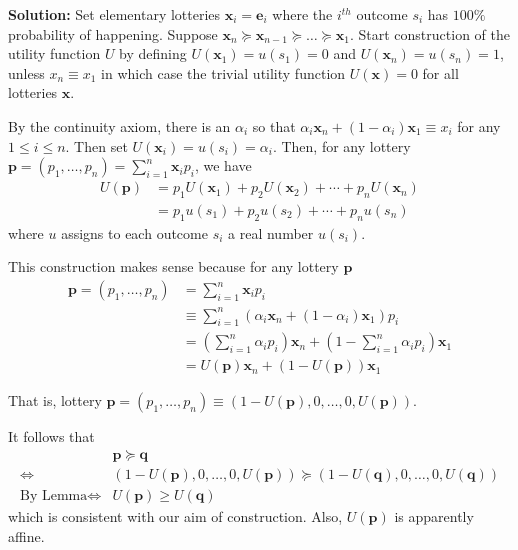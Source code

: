 \documentclass[13pt]{article}
\theoremstyle{definition}
\newenvironment{solution}
{\color{C2}\begin{framed}\begingroup\textbf{Solution:} }
  {\endgroup\end{framed}}
\theoremstyle{remark}
\begin{document}
\begin{solution}
Set elementary lotteries $\mathbf{x}_i = \mathbf{e}_i$ where the $i^{th}$ outcome $s_i$ has $100\%$ probability of happening. Suppose $\mathbf{x}_n\succeq \mathbf{x}_{n-1}\succeq \dots \succeq \mathbf{x}_1$. Start construction of the utility function $U$ by defining $U(\mathbf{x}_1)=u(s_1)=0$ and $U(\mathbf{x}_n)=u(s_n)=1$, unless $x_n\equiv x_1$ in which case the trivial utility function $U(\mathbf{x})=0$ for all lotteries $\mathbf{x}$. 

By the continuity axiom, there is an $\alpha_i$ so that $\alpha_i \mathbf{x}_n + (1-\alpha_i)\mathbf{x}_1\equiv x_i$ for any $1\leq i \leq n$. Then set $U(\mathbf{x}_i)=u(s_i) =\alpha_i$. Then, for any lottery $\mathbf{p}=(p_1,\dots,p_n) = \sum_{i=1}^n \mathbf{x}_i p_i$, we have
    \begin{align*}
        U(\mathbf{p}) &= p_1U(\mathbf{x}_1)+p_2U(\mathbf{x}_2)+\cdots + p_nU(\mathbf{x}_n)\\
        &=p_1u(s_1)+p_2u(s_2)+\cdots + p_nu(s_n)
    \end{align*}
where $u$ assigns to each outcome $s_i$ a real number $u(s_i)$.

This construction makes sense because for any lottery $\mathbf{p}$ \begin{align*}
        \mathbf{p}=(p_1,\dots,p_n) &= \sum_{i=1}^n \mathbf{x}_i p_i\\
        &\equiv \sum_{i=1}^n (\alpha_i \mathbf{x}_n + (1-\alpha_i)\mathbf{x}_1) p_i\\
        &=\left(\sum_{i=1}^n \alpha_i p_i\right) \mathbf{x}_n + \left(1-\sum_{i=1}^n \alpha_i p_i\right)\mathbf{x}_1\\
        &=U(\mathbf{p})\mathbf{x}_n+(1-U(\mathbf{p}))\mathbf{x}_1
    \end{align*}

    That is, lottery $\mathbf{p}=(p_1,\dots,p_n)\equiv(1-U(\mathbf{p}),0,\dots,0,U(\mathbf{p}))$. 
    
    It follows that
\begin{align*}&\mathbf{p}\succeq \mathbf{q}\\
\Longleftrightarrow &(1-U(\mathbf{p}),0,\dots,0,U(\mathbf{p}))\succeq (1-U(\mathbf{q}),0,\dots,0,U(\mathbf{q}))\\
\text{By Lemma}\Longleftrightarrow &U(\mathbf{p}) \ge U(\mathbf{q})
    \end{align*}
    which is consistent with our aim of construction. Also, $U(\mathbf{p})$ is apparently affine.
\end{solution}
\end{document}
